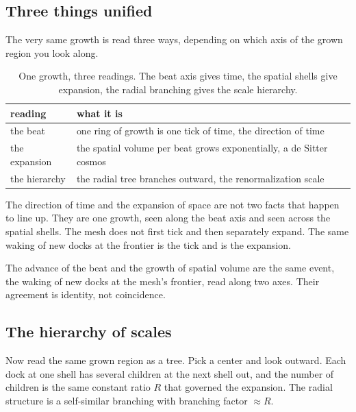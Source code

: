 \subsection{Three things unified}

The very same growth is read three ways, depending on which axis of the grown region you look along.

\begin{table}[ht]
\centering
\begin{tabular}{@{}ll@{}}
\toprule
reading & what it is \\
\midrule
the beat & one ring of growth is one tick of time, the direction of time \\
the expansion & the spatial volume per beat grows exponentially, a de Sitter cosmos \\
the hierarchy & the radial tree branches outward, the renormalization scale \\
\bottomrule
\end{tabular}
\caption{One growth, three readings. The beat axis gives time, the spatial shells give expansion, the radial branching gives the scale hierarchy.}
\label{tab:three-readings}
\end{table}

The direction of time and the expansion of space are not two facts that happen to line up. They are one growth, seen along the beat axis and seen across the spatial shells. The mesh does not first tick and then separately expand. The same waking of new docks at the frontier is the tick and is the expansion.

\begin{proposition}
The advance of the beat and the growth of spatial volume are the same event, the waking of new docks at the mesh's frontier, read along two axes. Their agreement is identity, not coincidence.
\end{proposition}

\subsection{The hierarchy of scales}

Now read the same grown region as a tree. Pick a center and look outward. Each dock at one shell has several children at the next shell out, and the number of children is the same constant ratio $R$ that governed the expansion. The radial structure is a self-similar branching with branching factor $\approx R$.

